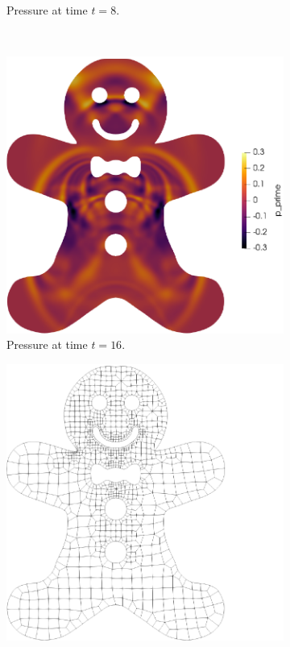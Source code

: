 \documentclass{juliacon}
\begin{document}
\begin{figure}[!h]
\begin{subfigure}{0.475\linewidth}
    \caption{Pressure at time $t = 8$.}
  \end{subfigure}%
  \\
  \begin{subfigure}{0.475\linewidth}
    \includegraphics[width=\textwidth]{../figures/ginger_time_16}
    \caption{Pressure at time $t = 16$.}
  \end{subfigure}%
  \hspace*{\fill}
  \begin{subfigure}{0.475\linewidth}
    \includegraphics[width=\textwidth]{../figures/ginger_mesh}

\end{subfigure}
\end{figure}
\end{document}
